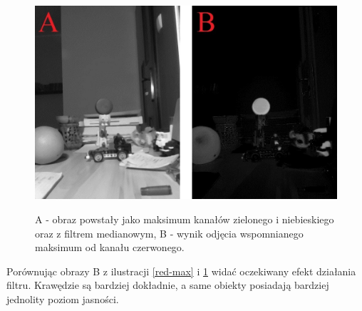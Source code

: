 \begin{figure}[H]
\begin{center}
\includegraphics[scale=0.42]{imgs/imgMax+RwoBG_med.jpg}
\caption[Kanał czerwony po odjęciu maksimum kanału zielonego i niebieskiego z filtrem medianowym.]\small{A - obraz powstały jako maksimum kanałów zielonego i niebieskiego oraz z filtrem medianowym, B - wynik odjęcia wspomnianego maksimum od kanału czerwonego.}
\label{red-maxM}
\end{center}
\end{figure}
Porównując obrazy B z ilustracji \ref{red-max} i \ref{red-maxM} widać oczekiwany efekt działania filtru. Krawędzie są bardziej dokładnie, a same obiekty posiadają bardziej jednolity poziom jasności.

